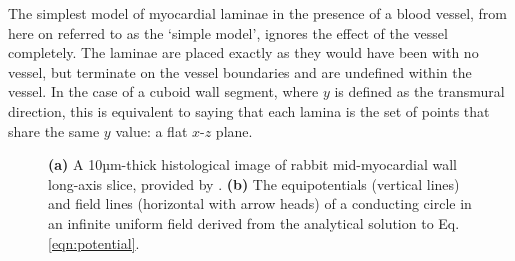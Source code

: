   The simplest model of myocardial laminae in the presence of a blood vessel, from here on referred to as the `simple model', ignores the effect of the vessel completely. The laminae are placed exactly as they would have been with no vessel, but terminate on the vessel boundaries and are undefined within the vessel. In the case of a cuboid wall segment, where $y$ is defined as the transmural direction, this is equivalent to saying that each lamina is the set of points that share the same $y$ value: a flat $x$-$z$ plane.

	\begin{figure}[htbp]
		\centering
		\qquad
    \caption{\textbf{(a)} A 10µm-thick histological image of rabbit mid-myocardial wall long-axis slice, provided by \cite{Burton2006}. \textbf{(b)} The equipotentials (vertical lines) and field lines (horizontal with arrow heads) of a conducting circle in an infinite uniform field derived from the analytical solution to Eq. \ref{eqn:potential}.}
	  \label{fig:vessel}
	\end{figure}
  
